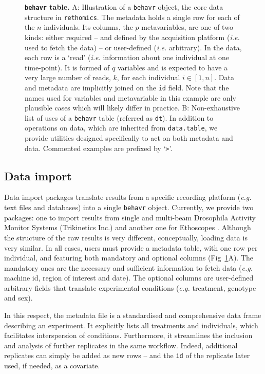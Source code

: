 \documentclass[10pt,letterpaper]{article}\usepackage[]{graphicx}\usepackage[]{color}
\begin{document}
\begin{figure}[!h]
	\caption{{\bf \texttt{behavr} table.}
	A: Illustration of a \texttt{behavr} object, the core data structure in \texttt{rethomics}.
		The metadata holds a single row for each of the $n$ individuals. 
		Its columns, the $p$ metavariables, are one of two kinds: either required -- and defined by the acquisition platform (\emph{i.e.} used to fetch the data) -- or user-defined (\emph{i.e.} arbitrary).
		In the data, each row is a `read' (\emph{i.e.} information about one individual at one time-point).
		It is formed of $q$ variables and is expected to have a very large number of reads, $k$, for each individual $i\in [1,n]$.
		Data and metadata are implicitly joined on the \texttt{id} field.
		Note that the names used for variables and metavariable in this example are only plausible cases which will likely differ in practice. 
		B: Non-exhaustive list of uses of a \texttt{behavr} table (referred as \texttt{dt}). 
		In addition to operations on data, which are inherited from \texttt{data.table},
		we provide utilities designed specifically to act on both metadata and data.  
		Commented examples are prefixed by `\texttt{>}'.
	}
	\label{fig:fig-2}
\end{figure}

\subsection*{Data import}
Data import packages translate results from a specific recording platform (\emph{e.g.} text files and databases) into a single \texttt{behavr} object.
Currently, we provide two packages: one to import results from single and multi-beam Drosophila Activity Monitor Systems (Trikinetics Inc.) 
and another one for Ethoscopes \cite{geissmann_ethoscopes_2017}.
Although the structure of the raw results is very different, conceptually, loading data is very similar.
In all cases, users must provide a metadata table, with one row per individual,
and featuring both mandatory and optional columns (Fig~\ref{fig:fig-2}A).
The mandatory ones are the necessary and sufficient information to fetch data (\emph{e.g.} machine id, region of interest and date). 
The optional columns are user-defined arbitrary fields that translate experimental conditions (\emph{e.g.} treatment, genotype and sex).

In this respect, the metadata file is a standardised and comprehensive data frame describing an experiment.
It explicitly lists all treatments and individuals, which facilitates interspersion of conditions.
Furthermore, it streamlines the inclusion and analysis of further replicates in the same workflow.
Indeed, additional replicates can simply be added as new rows -- and the \texttt{id} of the replicate later used, if needed, as a covariate.	
\end{document}
